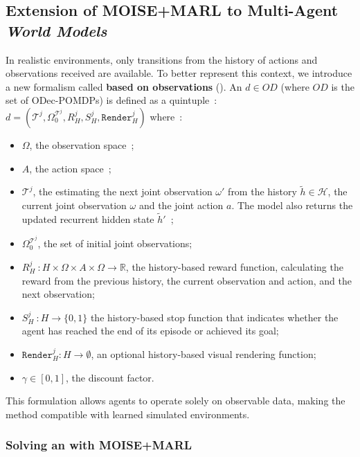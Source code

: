 \subsection{Extension of MOISE+MARL to Multi-Agent \textit{World Models}}\label{sec:wm_extension}

\noindent In realistic environments, only transitions from the history of actions and observations received are available. To better represent this context, we introduce a new formalism called \textbf{ based on observations} (). An  $d \in OD$ (where $OD$ is the set of ODec-POMDPs) is defined as a quintuple~:
%
$d = (\mathcal{T}^j, \Omega^{\mathcal{T}^j}_0, R^j_H, S^j_H, \texttt{Render}^j_H)$
%
where~:
\begin{itemize}
  \item $\Omega$, the observation space~;
  \item $A$, the action space~;
  \item $\mathcal{T}^j$, the  estimating the next joint observation $\omega'$ from the history $\tilde{h} \in \mathcal{H}$, the current joint observation $\omega$ and the joint action $a$. The model also returns the updated recurrent hidden state $\tilde{h}'$~;
  \item $\Omega^{\mathcal{T}^j}_0$, the set of initial joint observations;
  \item $R^j_H~: H \times \Omega \times A \times \Omega \rightarrow \mathbb{R}$, the history-based reward function, calculating the reward from the previous history, the current observation and action, and the next observation;
  \item $S^j_H~: H \rightarrow \{0,1\}$ the history-based stop function that indicates whether the agent has reached the end of its episode or achieved its goal;
  \item $\texttt{Render}^j_H : H \rightarrow \emptyset$, an optional history-based visual rendering function;
  \item $\gamma \in [0, 1]$, the discount factor.
\end{itemize}

\noindent This formulation allows  agents to operate solely on observable data, making the method compatible with learned simulated environments.

\subsubsection*{Solving an  with MOISE+MARL}

